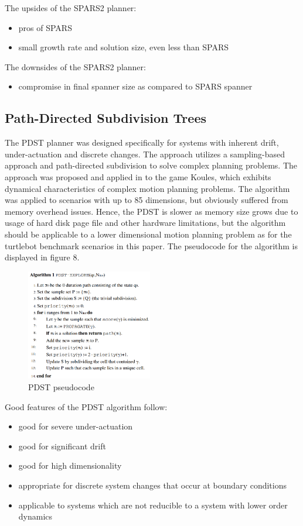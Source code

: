 \documentclass[conference]{IEEEtran} \usepackage[T1]{fontenc} \usepackage[backend=biber, style=ieee]{biblatex}
\begin{document}
The upsides of the SPARS2 planner:
\begin{itemize}
 \item pros of SPARS
 \item small growth rate and solution size, even less than SPARS
\end{itemize}

The downsides of the SPARS2 planner:
\begin{itemize}
 \item compromise in final spanner size as compared to SPARS spanner
\end{itemize}

\subsection{Path-Directed Subdivision Trees} \label{PDST}
The PDST planner was designed specifically for systems with inherent drift, under-actuation and discrete changes. The approach utilizes a sampling-based
approach and path-directed subdivision to solve complex planning problems. The approach was proposed and applied in \cite{pdst} to the game Koules, which exhibits 
dynamical characteristics of complex motion planning problems. The algorithm was applied to scenarios with up to 85 dimensions, but obviously suffered from
memory overhead issues. Hence, the PDST is slower as memory size grows due to usage of hard disk page file and other hardware limitations, but the algorithm
should be applicable to a lower dimensional motion planning problem as for the turtlebot benchmark scenarios in this paper. The pseudocode for the algorithm is displayed in figure 8.

\begin{figure}
\label{figure8} 
\centering 
\includegraphics[width=0.49\textwidth]{pdst}
\caption{PDST pseudocode}
\end{figure}

Good features of the PDST algorithm follow:
\begin{itemize}
 \item good for severe under-actuation
 \item good for significant drift
 \item good for high dimensionality
 \item appropriate for discrete system changes that occur at boundary conditions
 \item applicable to systems which are not reducible to a system with lower order dynamics
\end{itemize}
\end{document}
